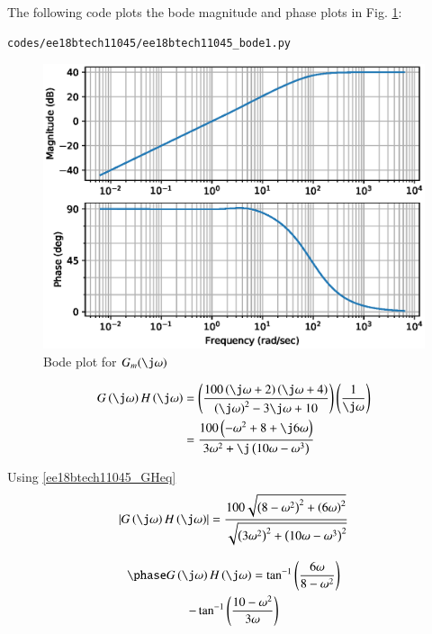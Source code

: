     
The following code plots the bode magnitude and phase plots in Fig. \ref{fig:ee18btech11045_bode1}:

\begin{lstlisting}
codes/ee18btech11045/ee18btech11045_bode1.py
\end{lstlisting}

\begin{figure}[!ht]
\centering
\includegraphics[width=\columnwidth]{./figs/ee18btech11045/ee18btech11045_bode1.eps}
\caption{Bode plot for $G_m(\j\omega)$}
\label{fig:ee18btech11045_bode1}
\end{figure}


%

\begin{align}
    G\brak{\j\omega}H\brak{\j\omega} &= \brak{\frac{100\brak{\j\omega+2}\brak{\j\omega+4}}{\brak{\j\omega}^2 - 3\j\omega + 10}}\brak{\frac{1}{\j\omega}}
    \\
    &= \frac{100\brak{-\omega^2 + 8 + \j6\omega}}{3\omega^2+\j\brak{10\omega-\omega^3}}
    \label{ee18btech11045_GHeq}
\end{align}

Using \eqref{ee18btech11045_GHeq}
\begin{align}
    \abs{G\brak{\j\omega}H\brak{\j\omega}} = \frac{100\sqrt{\brak{8-\omega^2}^2 + \brak{6\omega}^2}}{\sqrt{\brak{3\omega^2}^2 + \brak{10\omega - \omega^3}^2}}
    \label{ee18btech11045_gainGH}
\end{align}

\begin{multline}
        \phase G\brak{\j\omega}H\brak{\j\omega} = \tan^{-1}\brak{\frac{6\omega}{8 - \omega^2}} \\ - \tan^{-1}\brak{\frac{10 - \omega^2}{3\omega}}
    \label{ee18btech11045_phaseGH}
\end{multline}

